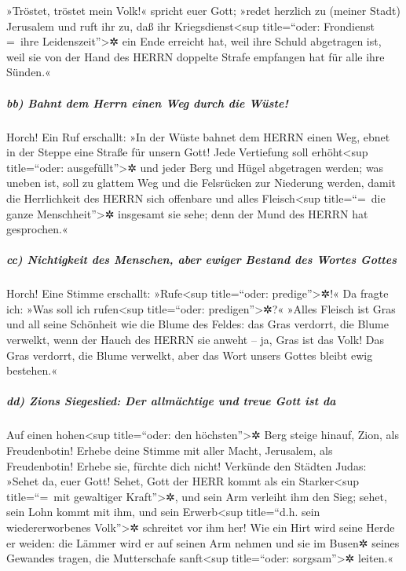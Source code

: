 »Tröstet, tröstet mein Volk!« spricht euer Gott;
»redet herzlich zu (meiner Stadt) Jerusalem und ruft ihr
zu, daß ihr Kriegsdienst\textless sup title=``oder: Frondienst =~ihre
Leidenszeit''\textgreater✲ ein Ende erreicht hat, weil ihre Schuld
abgetragen ist, weil sie von der Hand des HERRN doppelte Strafe
empfangen hat für alle ihre Sünden.«

\hypertarget{bb-bahnt-dem-herrn-einen-weg-durch-die-wuxfcste}{%
\subparagraph{bb) Bahnt dem Herrn einen Weg durch die
Wüste!}\label{bb-bahnt-dem-herrn-einen-weg-durch-die-wuxfcste}}

Horch! Ein Ruf erschallt: »In der Wüste bahnet dem HERRN
einen Weg, ebnet in der Steppe eine Straße für unsern Gott!
Jede Vertiefung soll erhöht\textless sup title=``oder:
ausgefüllt''\textgreater✲ und jeder Berg und Hügel abgetragen werden;
was uneben ist, soll zu glattem Weg und die Felsrücken zur Niederung
werden, damit die Herrlichkeit des HERRN sich offenbare
und alles Fleisch\textless sup title=``=~die ganze
Menschheit''\textgreater✲ insgesamt sie sehe; denn der Mund des HERRN
hat gesprochen.«

\hypertarget{cc-nichtigkeit-des-menschen-aber-ewiger-bestand-des-wortes-gottes}{%
\subparagraph{cc) Nichtigkeit des Menschen, aber ewiger Bestand des
Wortes
Gottes}\label{cc-nichtigkeit-des-menschen-aber-ewiger-bestand-des-wortes-gottes}}

Horch! Eine Stimme erschallt: »Rufe\textless sup
title=``oder: predige''\textgreater✲!« Da fragte ich: »Was soll ich
rufen\textless sup title=``oder: predigen''\textgreater✲?« »Alles
Fleisch ist Gras und all seine Schönheit wie die Blume des Feldes:
das Gras verdorrt, die Blume verwelkt, wenn der Hauch des
HERRN sie anweht -- ja, Gras ist das Volk! Das Gras
verdorrt, die Blume verwelkt, aber das Wort unsers Gottes bleibt ewig
bestehen.«

\hypertarget{dd-zions-siegeslied-der-allmuxe4chtige-und-treue-gott-ist-da}{%
\subparagraph{dd) Zions Siegeslied: Der allmächtige und treue Gott ist
da}\label{dd-zions-siegeslied-der-allmuxe4chtige-und-treue-gott-ist-da}}

Auf einen hohen\textless sup title=``oder: den
höchsten''\textgreater✲ Berg steige hinauf, Zion, als Freudenbotin!
Erhebe deine Stimme mit aller Macht, Jerusalem, als Freudenbotin! Erhebe
sie, fürchte dich nicht! Verkünde den Städten Judas: »Sehet da, euer
Gott! Sehet, Gott der HERR kommt als ein
Starker\textless sup title=``=~mit gewaltiger Kraft''\textgreater✲, und
sein Arm verleiht ihm den Sieg; sehet, sein Lohn kommt mit ihm, und sein
Erwerb\textless sup title=``d.h. sein wiedererworbenes
Volk''\textgreater✲ schreitet vor ihm her! Wie ein Hirt
wird seine Herde er weiden: die Lämmer wird er auf seinen Arm nehmen und
sie im Busen✲ seines Gewandes tragen, die Mutterschafe
sanft\textless sup title=``oder: sorgsam''\textgreater✲ leiten.«

